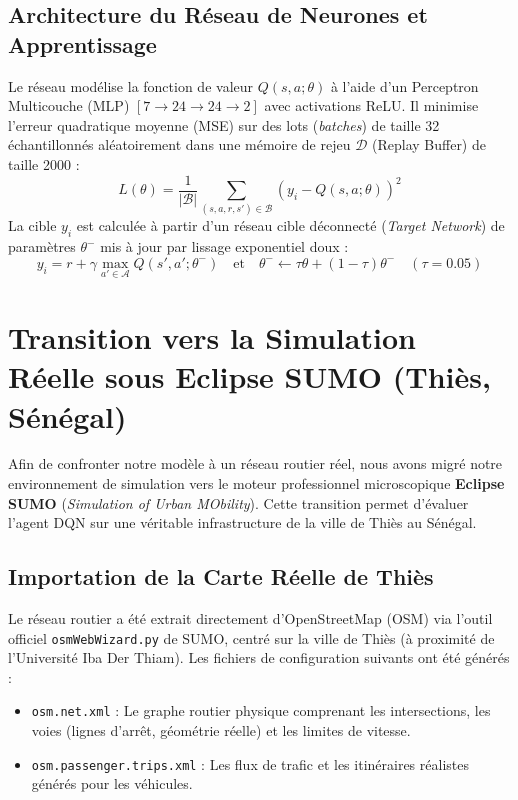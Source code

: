 \documentclass[11pt,a4paper]{article}
\begin{document}
\subsection{Architecture du Réseau de Neurones et Apprentissage}
Le réseau modélise la fonction de valeur $Q(s, a; \theta)$ à l'aide d'un Perceptron Multicouche (MLP) $[7 \rightarrow 24 \rightarrow 24 \rightarrow 2]$ avec activations ReLU. Il minimise l'erreur quadratique moyenne (MSE) sur des lots (\textit{batches}) de taille 32 échantillonnés aléatoirement dans une mémoire de rejeu $\mathcal{D}$ (Replay Buffer) de taille 2000 :
\begin{equation}
    L(\theta) = \frac{1}{|\mathcal{B}|} \sum_{(s, a, r, s') \in \mathcal{B}} \left( y_i - Q(s, a; \theta) \right)^2
\end{equation}
La cible $y_i$ est calculée à partir d'un réseau cible déconnecté (\textit{Target Network}) de paramètres $\theta^-$ mis à jour par lissage exponentiel doux :
\begin{equation}
    y_i = r + \gamma \max_{a' \in \mathcal{A}} Q(s', a'; \theta^-) \quad \text{et} \quad \theta^- \leftarrow \tau \theta + (1 - \tau) \theta^- \quad (\tau = 0.05)
\end{equation}

\section{Transition vers la Simulation Réelle sous Eclipse SUMO (Thiès, Sénégal)}
Afin de confronter notre modèle à un réseau routier réel, nous avons migré notre environnement de simulation vers le moteur professionnel microscopique \textbf{Eclipse SUMO} (\textit{Simulation of Urban MObility}). Cette transition permet d'évaluer l'agent DQN sur une véritable infrastructure de la ville de Thiès au Sénégal.

\subsection{Importation de la Carte Réelle de Thiès}
Le réseau routier a été extrait directement d'OpenStreetMap (OSM) via l'outil officiel \texttt{osmWebWizard.py} de SUMO, centré sur la ville de Thiès (à proximité de l'Université Iba Der Thiam). Les fichiers de configuration suivants ont été générés :
\begin{itemize}
    \item \texttt{osm.net.xml} : Le graphe routier physique comprenant les intersections, les voies (lignes d'arrêt, géométrie réelle) et les limites de vitesse.
    \item \texttt{osm.passenger.trips.xml} : Les flux de trafic et les itinéraires réalistes générés pour les véhicules.
\end{itemize}
\end{document}
